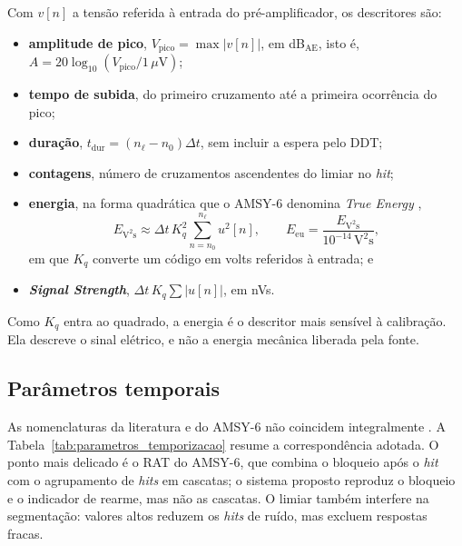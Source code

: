 Com \(v[n]\) a tensão referida à entrada do pré-amplificador, os descritores são:
\begin{itemize}
	\item \textbf{amplitude de pico}, \(V_{\mathrm{pico}} = \max|v[n]|\), em dB\(_{\mathrm{AE}}\), isto é, \(A = 20\log_{10}(V_{\mathrm{pico}}/1\,\mu\mathrm{V})\);
	\item \textbf{tempo de subida}, do primeiro cruzamento até a primeira ocorrência do pico;
	\item \textbf{duração}, \(t_{\mathrm{dur}} = (n_\ell - n_0)\Delta t\), sem incluir a espera pelo DDT;
	\item \textbf{contagens}, número de cruzamentos ascendentes do limiar no \textit{hit};
	\item \textbf{energia}, na forma quadrática que o AMSY-6 denomina \textit{True Energy} \cite{vallen2022},
	\begin{equation}
		E_{\mathrm{V^2s}} \approx \Delta t\,K_q^2 \sum_{n=n_0}^{n_\ell} u^2[n], \qquad E_{\mathrm{eu}} = \frac{E_{\mathrm{V^2s}}}{10^{-14}\,\mathrm{V^2s}},
		\label{eq:true_energy}
	\end{equation}
	em que \(K_q\) converte um código em volts referidos à entrada; e
	\item \textbf{\textit{Signal Strength}}, \(\Delta t\,K_q\sum|u[n]|\), em nVs.
\end{itemize}
Como \(K_q\) entra ao quadrado, a energia é o descritor mais sensível à calibração. Ela descreve o sinal elétrico, e não a energia mecânica liberada pela fonte.

\subsection{Parâmetros temporais}
\label{subsec:parametros_temporizacao}

As nomenclaturas da literatura e do AMSY-6 não coincidem integralmente \cite{unnthorsson2013,vallen2022}. A Tabela~\ref{tab:parametros_temporizacao} resume a correspondência adotada. O ponto mais delicado é o RAT do AMSY-6, que combina o bloqueio após o \textit{hit} com o agrupamento de \textit{hits} em cascatas; o sistema proposto reproduz o bloqueio e o indicador de rearme, mas não as cascatas. O limiar também interfere na segmentação: valores altos reduzem os \textit{hits} de ruído, mas excluem respostas fracas.


